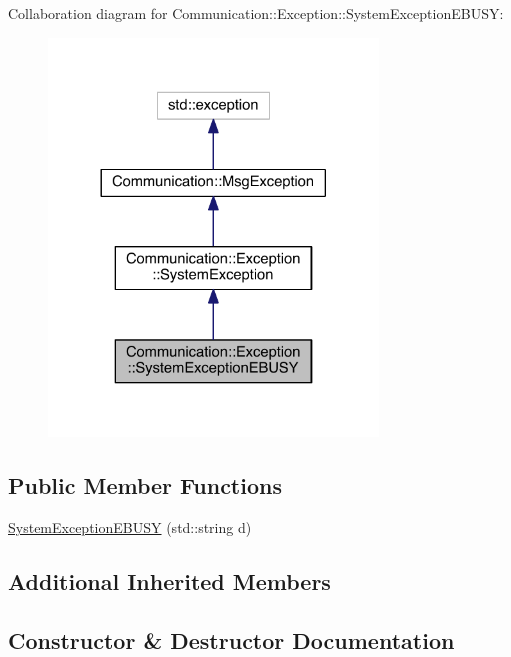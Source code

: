 Collaboration diagram for Communication\+:\+:Exception\+:\+:System\+Exception\+E\+B\+U\+S\+Y\+:\nopagebreak
\begin{figure}[H]
\begin{center}
\leavevmode
\includegraphics[width=248pt]{class_communication_1_1_exception_1_1_system_exception_e_b_u_s_y__coll__graph}
\end{center}
\end{figure}
\subsection*{Public Member Functions}
\begin{DoxyCompactItemize}
\item 
\hyperlink{class_communication_1_1_exception_1_1_system_exception_e_b_u_s_y_a8e2de335e4194ba8cdadafb3e135849f}{System\+Exception\+E\+B\+U\+S\+Y} (std\+::string d)
\end{DoxyCompactItemize}
\subsection*{Additional Inherited Members}


\subsection{Constructor \& Destructor Documentation}
\hypertarget{class_communication_1_1_exception_1_1_system_exception_e_b_u_s_y_a8e2de335e4194ba8cdadafb3e135849f}{}
